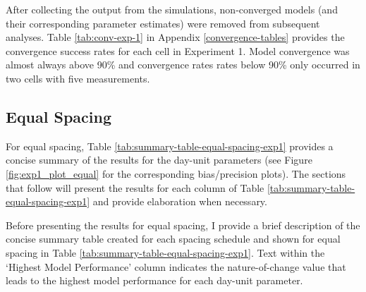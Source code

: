 \documentclass[
12pt, %
twoside,
english]{guelphthesis}
\begin{document}
After collecting the output from the simulations, non-converged models
(and their corresponding parameter estimates) were removed from
subsequent analyses. Table \ref{tab:conv-exp-1} in Appendix \ref{convergence-tables} provides the convergence
success rates for each cell in Experiment 1. Model convergence was almost always above 90\% and convergence rates
rates below 90\% only occurred in two cells with five measurements.

\hypertarget{concise-tab}{%
\subsection{Equal Spacing}\label{concise-tab}}

For equal spacing, Table \ref{tab:summary-table-equal-spacing-exp1} provides a concise summary of the results for the day-unit parameters (see Figure \ref{fig:exp1_plot_equal} for the corresponding bias/precision plots). The sections that follow will present the results for each column of Table \ref{tab:summary-table-equal-spacing-exp1} and provide elaboration when necessary.

Before presenting the results for equal spacing, I provide a brief description of the concise summary table created for each spacing schedule and shown for equal spacing in Table \ref{tab:summary-table-equal-spacing-exp1}. Text within the `Highest Model Performance' column indicates the nature-of-change value that leads to the highest model performance for each day-unit parameter.
\end{document}

